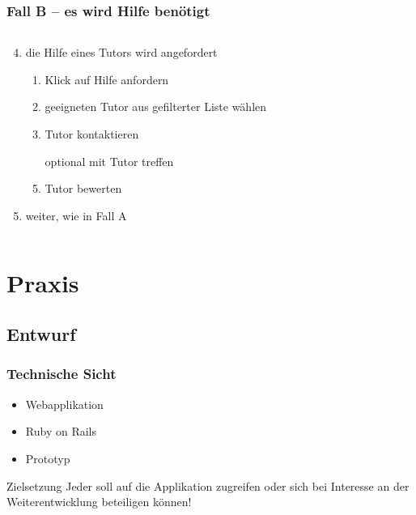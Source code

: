\documentclass[xcolor=dvipsnames, utf8]{beamer}
\begin{document}
\begin{frame}
\frametitle{Fall B -- es wird Hilfe benötigt}
\begin{columns}
\begin{column}{7cm}
\begin{enumerate}
  \setcounter{enumi}{3}
  \item die Hilfe eines Tutors wird angefordert\begin{enumerate}
    \item Klick auf Hilfe anfordern
    \item geeigneten Tutor aus gefilterter Liste wählen
    \item Tutor kontaktieren
    \item[optional] mit Tutor treffen
    \item Tutor bewerten
  \end{enumerate}
  \item weiter, wie in Fall A
\end{enumerate}
\end{column}
\begin{column}{3cm}
\end{column}
\end{columns}
\end{frame}

\section{Praxis}
\subsection{Entwurf}
\begin{frame}
\frametitle{Technische Sicht}
\begin{itemize}
  \item Webapplikation
  \item Ruby on Rails
  \item Prototyp
  \end{itemize}
  \begin{block}{Zielsetzung}
  Jeder soll auf die Applikation zugreifen oder sich bei Interesse an der
  Weiterentwicklung beteiligen können!
  \end{block}
  \end{frame}
  
\end{document}
